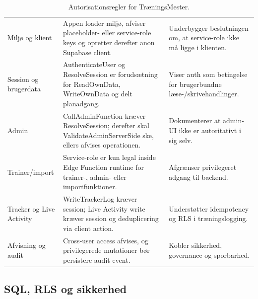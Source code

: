\begin{table}[htbp]
\small
\renewcommand{\arraystretch}{1.15}
\begin{tabularx}{\textwidth}{>{\RaggedRight\arraybackslash}p{} >{\RaggedRight\arraybackslash}p{} Y}
\toprule
{} &  &  \\
\midrule
Miljø og klient & Appen loader miljø, afviser placeholder- eller service-role keys og opretter derefter anon Supabase client. & Underbygger beslutningen om, at service-role ikke må ligge i klienten. \\
Session og brugerdata & AuthenticateUser og ResolveSession er forudsætning for ReadOwnData, WriteOwnData og delt planadgang. & Viser auth som betingelse for brugerbundne læse-/skrivehandlinger. \\
Admin & CallAdminFunction kræver ResolveSession; derefter skal ValidateAdminServerSide ske, ellers afvises operationen. & Dokumenterer at admin-UI ikke er autoritativt i sig selv. \\
Trainer/import & Service-role er kun legal inside Edge Function runtime for trainer-, admin- eller importfunktioner. & Afgrænser privilegeret adgang til backend. \\
Tracker og Live Activity & WriteTrackerLog kræver session; Live Activity write kræver session og deduplicering via client action. & Understøtter idempotency og RLS i træningslogging. \\
Afvisning og audit & Cross-user access afvises, og privilegerede mutationer bør persistere audit event. & Kobler sikkerhed, governance og sporbarhed. \\
\bottomrule
\end{tabularx}
\caption{Autorisationsregler for TræningsMester.}
\label{tab:tm-authorization-dcr}
\end{table}

\clearpage

\subsection{SQL, RLS og sikkerhed}

